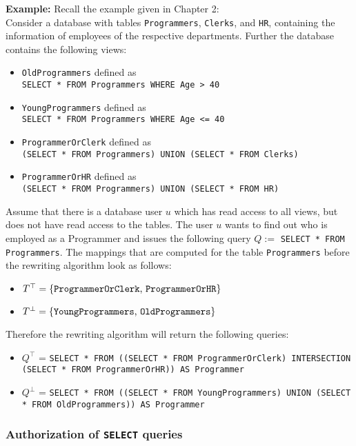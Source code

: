 \smallskip
\noindent
{\bf Example:}
Recall the example given in Chapter 2:
\\
Consider a database with tables \texttt{Programmers}, \texttt{Clerks}, and \texttt{HR}, containing the information of employees of the respective departments.
%
Further the database contains the following views:
\begin{itemize}
	\item \texttt{OldProgrammers} defined as \\ \texttt{SELECT * FROM Programmers WHERE Age > 40}
	\item \texttt{YoungProgrammers} defined as \\ \texttt{SELECT * FROM Programmers WHERE Age <= 40}
	\item \texttt{ProgrammerOrClerk} defined as \\ \texttt{(SELECT * FROM Programmers) UNION (SELECT * FROM Clerks)}
	\item \texttt{ProgrammerOrHR} defined as \\ \texttt{(SELECT * FROM Programmers) UNION (SELECT * FROM HR)}
\end{itemize}
%
Assume that there is a database user $u$ which has read access to all views, but does not have read access to the tables.
%
The user $u$ wants to find out who is employed as a Programmer and issues the following query $Q := $ \texttt{SELECT * FROM Programmers}.
%
The mappings that are computed for the table \texttt{Programmers} before the rewriting algorithm look as follows:
\begin{itemize}
	\item $T^\top = \lbrace \text{\texttt{ProgrammerOrClerk}, \texttt{ProgrammerOrHR}} \rbrace$
	\item $T^\bot = \lbrace \text{\texttt{YoungProgrammers}, \texttt{OldProgrammers}} \rbrace$
\end{itemize}
%
Therefore the rewriting algorithm will return the following queries:
\begin{itemize}
	\item $Q^\top$ = \texttt{SELECT * FROM ((SELECT * FROM ProgrammerOrClerk) INTERSECTION (SELECT * FROM ProgrammerOrHR)) AS Programmer}
	\item $Q^\bot$ = \texttt{SELECT * FROM ((SELECT * FROM YoungProgrammers) UNION (SELECT * FROM OldProgrammers)) AS Programmer}
\end{itemize}

\subsubsection{Authorization of \texttt{SELECT} queries}

